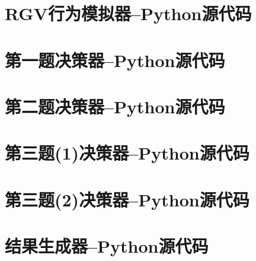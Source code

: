 \documentclass{cumcmthesis}
\begin{document}
\newpage
\begin{appendices}
\section{RGV行为模拟器--Python源代码}

\section{第一题决策器--Python源代码}

\section{第二题决策器--Python源代码}

\section{第三题(1)决策器--Python源代码}

\section{第三题(2)决策器--Python源代码}

\section{结果生成器--Python源代码}



\end{appendices}
\end{document}
